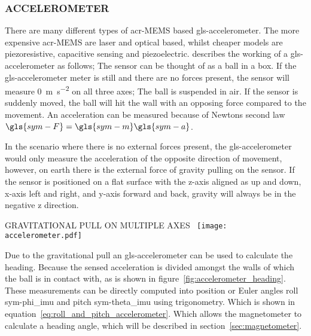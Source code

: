 \newpage

\subsubsection{ACCELEROMETER}

There are many different types of \gls{acr-MEMS} based \gls{gls-accelerometer}. The more expensive \gls{acr-MEMS} are
laser and optical based, whilst cheaper models are piezoresistive, capacitive sensing and piezoelectric. 
\citet{leccadito_kalman_2013} describes the working of a \gls{gls-accelerometer} as follows; The sensor can be 
thought of as a ball in a box. If the \gls{gls-accelerometer} meter is still and there are no forces present, the 
sensor will measure \SI{0}{\meter\per\second\squared} on all three axes; The ball is suspended in air. If the sensor 
is suddenly moved, the ball will hit the wall with an opposing force compared to the movement. An acceleration can be
measured because of Newtons second law \( \gls{sym-F} = \gls{sym-m}  \gls{sym-a}  \).

In the scenario where there is no external forces present, the \gls{gls-accelerometer} would only measure the
acceleration of the opposite direction of movement, however, on earth there is the external force of gravity pulling on
the sensor. If the sensor is positioned on a flat surface with the z-axis aligned as up and down, x-axis left and right,
and y-axis forward and back, gravity will always be in the negative z direction.

\begin{RoyalFigure}[!htb, label=fig:accelerometer_heading]{GRAVITATIONAL PULL ON MULTIPLE 
AXES~\cite{leccadito_kalman_2013}}
    \texttt{[image: accelerometer.pdf]}
\end{RoyalFigure}

Due to the gravitational pull an \gls{gls-accelerometer} can be used to calculate the heading. Because the sensed
acceleration is divided amongst the walls of which the ball is in contact with, as is shown in
figure~\ref{fig:accelerometer_heading}. These measurements can be directly computed into position or Euler angles roll
\gls{sym-phi_imu}  and pitch \gls{sym-theta_imu} using trigonometry. Which is shown in
equation~\ref{eq:roll_and_pitch_accelerometer}. Which allows the magnetometer to calculate a heading angle, which will
be described in section~\ref{sec:magnetometer}.

